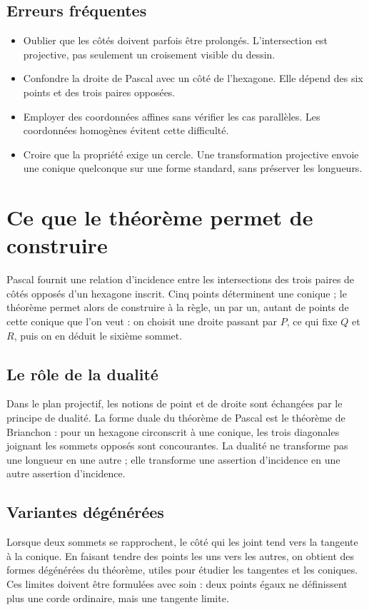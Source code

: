 \subsection{Erreurs fréquentes}
\begin{itemize}
 \item Oublier que les côtés doivent parfois être prolongés. L'intersection est projective, pas seulement un croisement visible du dessin.
 \item Confondre la droite de Pascal avec un côté de l'hexagone. Elle dépend des six points et des trois paires opposées.
 \item Employer des coordonnées affines sans vérifier les cas parallèles. Les coordonnées homogènes évitent cette difficulté.
 \item Croire que la propriété exige un cercle. Une transformation projective envoie une conique quelconque sur une forme standard, sans préserver les longueurs.
\end{itemize}

\section{Ce que le théorème permet de construire}
Pascal fournit une relation d'incidence entre les intersections des trois paires de côtés opposés d'un hexagone inscrit. Cinq points déterminent une conique ; le théorème permet alors de construire à la règle, un par un, autant de points de cette conique que l'on veut : on choisit une droite passant par $P$, ce qui fixe $Q$ et $R$, puis on en déduit le sixième sommet.

\subsection{Le rôle de la dualité}
Dans le plan projectif, les notions de point et de droite sont échangées par le principe de dualité. La forme duale du théorème de Pascal est le théorème de Brianchon : pour un hexagone circonscrit à une conique, les trois diagonales joignant les sommets opposés sont concourantes. La dualité ne transforme pas une longueur en une autre ; elle transforme une assertion d'incidence en une autre assertion d'incidence.

\subsection{Variantes dégénérées}
Lorsque deux sommets se rapprochent, le côté qui les joint tend vers la tangente à la conique. En faisant tendre des points les uns vers les autres, on obtient des formes dégénérées du théorème, utiles pour étudier les tangentes et les coniques. Ces limites doivent être formulées avec soin : deux points égaux ne définissent plus une corde ordinaire, mais une tangente limite.

